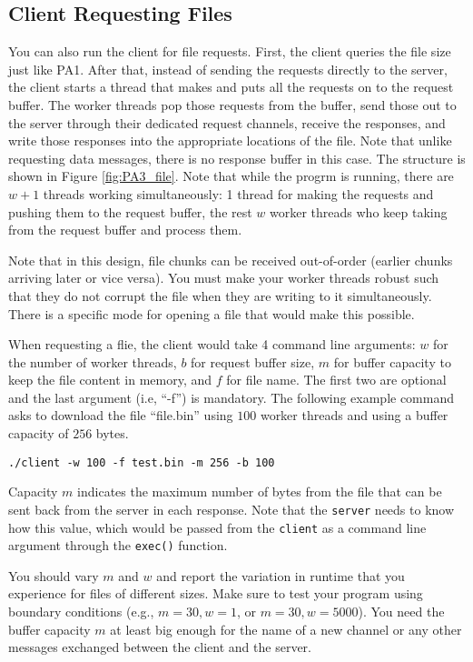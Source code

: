 \documentclass[12pt]{article}
\begin{document}
\subsection*{Client Requesting Files}
You can also run the client for file requests. First, the client queries the file size just like PA1. After that, instead of sending the requests directly to the server, the client starts a thread that makes and puts all the requests on to the request buffer. The worker threads pop those requests from the buffer, send those out to the server through their dedicated request channels, receive the responses, and write those responses into the appropriate locations of the file. Note that unlike requesting data messages, there is no response buffer in this case. The structure is shown in Figure \ref{fig:PA3_file}. Note that while the progrm is running, there are $w+1$ threads working simultaneously: 1 thread for making the requests and pushing them to the request buffer, the rest $w$ worker threads who keep taking from the request buffer and process them.

Note that in this design, file chunks can be received out-of-order (earlier chunks arriving later or vice versa). You must make your worker threads robust such that they do not corrupt the file when they are writing to it simultaneously. There is a specific mode for opening a file that would make this possible.

When requesting a flie, the client would take 4 command line arguments: $w$ for the number of worker threads, $b$ for request buffer size, $m$ for buffer capacity to keep the file content in memory, and $f$ for file name. The first two are optional and the last argument (i.e, ``-f'') is mandatory. The following example command asks to download the file ``file.bin'' using $100$ worker threads and using a buffer capacity of $256$ bytes. 

\begin{lstlisting}[style=bash]
	./client -w 100 -f test.bin -m 256 -b 100
\end{lstlisting}	

Capacity $m$ indicates the maximum number of bytes from the file that can be sent back from the server in each response. Note that the \texttt{server} needs to know how this value, which would be passed from the \texttt{client} as a command line argument through the \texttt{exec()} function.  

You should vary $m$ and $w$ and report the variation in runtime that you experience for files of different sizes. Make sure to test your program using boundary conditions (e.g., $m=30, w=1$, or $m=30, w=5000$). You need the buffer capacity $m$ at least big enough for the name of a new channel or any other messages exchanged between the client and the server. 
\end{document}
